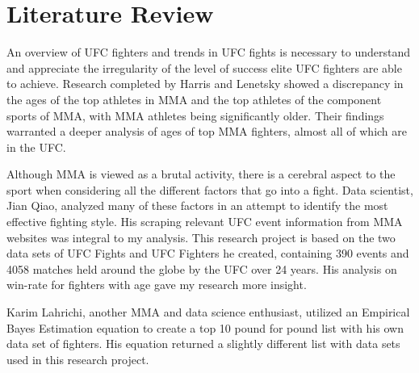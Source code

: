 \documentclass[12pt,english]{report}
\begin{document}
\section{Literature Review}
\label{sec:litreview}
\par An overview of UFC fighters and trends in UFC fights is necessary to understand and appreciate the irregularity of the level of success elite UFC fighters are able to achieve. Research completed by Harris and Lenetsky showed a discrepancy in the ages of the top athletes in MMA and the top athletes of the component sports of MMA, with MMA athletes being significantly older. \cite{lenetsky_harris_2012} Their findings warranted a deeper analysis of ages of top MMA fighters, almost all of which are in the UFC. \par Although MMA is viewed as a brutal activity, there is a cerebral aspect to the sport when considering all the different factors that go into a fight. Data scientist, Jian Qiao, analyzed many of these factors in an attempt to identify the most effective fighting style. His scraping relevant UFC event information from MMA websites was integral to my analysis. This research project is based on the two data sets of UFC Fights and UFC Fighters he created, containing 390 events and 4058 matches held around the globe by the UFC over 24 years. \cite{qiao_ji2017} His analysis on win-rate for fighters with age gave my research more insight. \par Karim Lahrichi, another MMA and data science enthusiast, utilized an Empirical Bayes Estimation equation to create a top 10 pound for pound list with his own data set of fighters. His equation returned a slightly different list with data sets used in this research project.  
\end{document}
